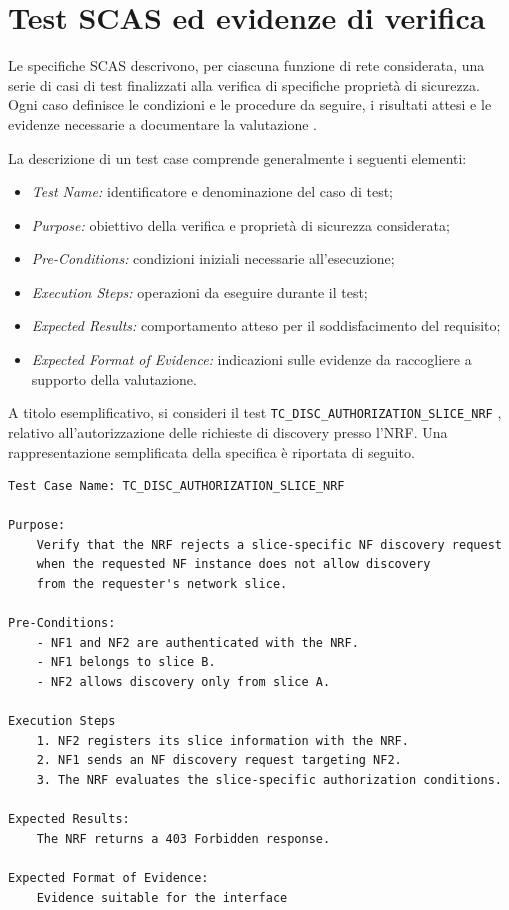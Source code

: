 \section{Test SCAS ed evidenze di verifica}
\label{test-scas-ed-evidenze-di-verifica}

Le specifiche SCAS descrivono, per ciascuna funzione di rete considerata, una serie di casi di test finalizzati alla verifica di specifiche proprietà di sicurezza. Ogni caso definisce le condizioni e le procedure da seguire, i risultati attesi e le evidenze necessarie a documentare la valutazione \cite{3gpp_ts33117_2019,3gpp_tr33916_2024}.

La descrizione di un test case comprende generalmente i seguenti elementi:

\begin{itemize}
\tightlist
\item
  \emph{Test Name:} identificatore e denominazione del caso di test;
\item
  \emph{Purpose:} obiettivo della verifica e proprietà di sicurezza considerata;
\item
  \emph{Pre-Conditions:} condizioni iniziali necessarie all'esecuzione;
\item
  \emph{Execution Steps:} operazioni da eseguire durante il test;
\item
  \emph{Expected Results:} comportamento atteso per il soddisfacimento del requisito;
\item
  \emph{Expected Format of Evidence:} indicazioni sulle evidenze da raccogliere a supporto della valutazione.
\end{itemize}

A titolo esemplificativo, si consideri il test \texttt{TC\_DISC\_AUTHORIZATION\_SLICE\_NRF} \cite{3gpp_ts33518_2024}, relativo all'autorizzazione delle richieste di discovery presso l'NRF. Una rappresentazione semplificata della specifica è riportata di seguito.

\par\noindent\begin{minipage}{\linewidth}
\begin{lstlisting}
Test Case Name: TC_DISC_AUTHORIZATION_SLICE_NRF

Purpose:
    Verify that the NRF rejects a slice-specific NF discovery request 
    when the requested NF instance does not allow discovery
    from the requester's network slice.

Pre-Conditions:
    - NF1 and NF2 are authenticated with the NRF.
    - NF1 belongs to slice B.
    - NF2 allows discovery only from slice A.

Execution Steps
    1. NF2 registers its slice information with the NRF.
    2. NF1 sends an NF discovery request targeting NF2.
    3. The NRF evaluates the slice-specific authorization conditions.

Expected Results:
    The NRF returns a 403 Forbidden response.
    
Expected Format of Evidence:
    Evidence suitable for the interface
\end{lstlisting}
\end{minipage}\par

